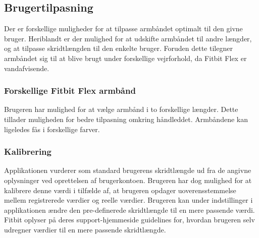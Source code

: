 \subsection{Brugertilpasning} \label{sec:brugertilpasning}
Der er forskellige muligheder for at tilpasse armbåndet optimalt til den givne bruger. Heriblandt er der mulighed for at udskifte armbåndet til andre længder, og at tilpasse skridtlængden til den enkelte bruger. Foruden dette tilegner armbåndet sig til at blive brugt under forskellige vejrforhold, da Fitbit Flex er vandafvisende. 

\subsubsection{Forskellige Fitbit Flex armbånd}
Brugeren har mulighed for at vælge armbånd i to forskellige længder. Dette tillader muligheden for bedre tilpasning omkring håndleddet. Armbåndene kan ligeledes fås i forskellige farver.

\subsubsection{Kalibrering}
Applikationen vurderer som standard brugerens skridtlængde ud fra de angivne oplysninger ved oprettelsen af brugerkontoen. Brugeren har dog mulighed for at kalibrere denne værdi i tilfælde af, at brugeren opdager uoverensstemmelse mellem registrerede værdier og reelle værdier. Brugeren kan under indstillinger i applikationen ændre den pre-definerede skridtlængde til en mere passende værdi. Fitbit oplyser på deres support-hjemmeside guidelines for, hvordan brugeren selv udregner værdier til en mere passende skridtlængde.   

